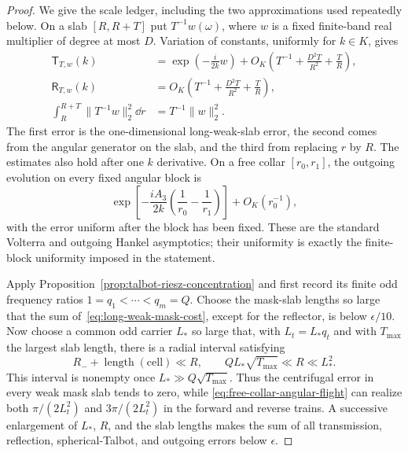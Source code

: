 \begin{proof}
We give the scale ledger, including the two approximations used repeatedly
below.  On a slab $[R,R+T]$ put $T^{-1}w(\omega)$, where $w$ is a fixed
finite-band real multiplier of degree at most $D$.  Variation of constants,
uniformly for $k\in K$, gives
\begin{align}
 \mathsf T_{T,w}(k)
 &=\exp\!\left(-\frac{i}{2k}w\right)
   +O_K\!\left(T^{-1}+\frac{D^2T}{R^2}+\frac{T}{R}\right),
 \label{eq:long-weak-mask-transmission}\\
 \mathsf R_{T,w}(k)
 &=O_K\!\left(T^{-1}+\frac{D^2T}{R^2}+\frac{T}{R}\right),
 \label{eq:long-weak-mask-reflection}\\
 \int_R^{R+T}\|T^{-1}w\|_2^2\dd r
 &=T^{-1}\|w\|_2^2.
 \label{eq:long-weak-mask-cost}
\end{align}
The first error is the one-dimensional long-weak-slab error, the second comes
from the angular generator on the slab, and the third from replacing $r$ by
$R$.  The estimates also hold after one $k$ derivative.  On a free collar
$[r_0,r_1]$, the outgoing evolution on every fixed angular block is
\begin{equation}
 \exp\!\left[-\frac{iA_3}{2k}
       \left(\frac1{r_0}-\frac1{r_1}\right)\right]
 +O_K(r_0^{-1}),
 \label{eq:free-collar-angular-flight}
\end{equation}
with the error uniform after the block has been fixed.  These are the standard
Volterra and outgoing Hankel asymptotics; their uniformity is exactly the
finite-block uniformity imposed in the statement.

Apply Proposition~\ref{prop:talbot-riesz-concentration} and first record its
finite odd frequency ratios $1=q_1<\cdots<q_m=Q$.  Choose the mask-slab
lengths so large that the sum of~\eqref{eq:long-weak-mask-cost}, except for
the reflector, is below $\epsilon/10$.  Now choose a common odd carrier
$L_\ast$ so large that, with $L_t=L_\ast q_t$ and with $T_{\max}$ the largest
slab length, there is a radial interval satisfying
\begin{equation}
 R_-+\operatorname{length}(\text{cell})\ll R,\qquad
 QL_\ast\sqrt{T_{\max}}\ll R\ll L_\ast^2.
 \label{eq:riesz-cell-scale-separation}
\end{equation}
This interval is nonempty once $L_\ast\gg Q\sqrt{T_{\max}}$.  Thus the
centrifugal error in every weak mask slab tends to zero, while
\eqref{eq:free-collar-angular-flight} can realize both
$\pi/(2L_t^2)$ and $3\pi/(2L_t^2)$ in the forward and reverse trains.  A
successive enlargement of $L_\ast$, $R$, and the slab lengths makes the sum
of all transmission, reflection, spherical-Talbot, and outgoing errors below
$\epsilon$.


\end{proof}
